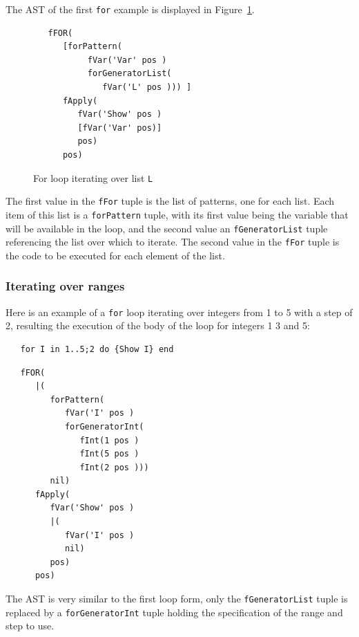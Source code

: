 \documentclass[a4paper]{memoir}
\begin{document}
The AST of the first \lstinline!for! example is displayed in Figure~\ref{fig:forlist}.
\begin{figure}[h]
\begin{lstlisting}
   fFOR(
      [forPattern(
           fVar('Var' pos )
           forGeneratorList(
              fVar('L' pos ))) ]
      fApply(
         fVar('Show' pos )
         [fVar('Var' pos)]
         pos)
      pos)
\end{lstlisting}
\caption{For loop iterating over list \lstinline!L!}
\label{fig:forlist}
\end{figure}


The first value in the \lstinline!fFor! tuple is the list of patterns, one
for each list. Each item of this list is a \lstinline!forPattern! tuple, with
its first value being the variable that will be available in the loop, and the
second value an \lstinline!fGeneratorList! tuple referencing the list over which to
iterate.
The second value in the \lstinline!fFor! tuple is the code to be executed for
each element of the list.

\subsubsection{Iterating over ranges}
Here is an example of a \lstinline!for! loop iterating over integers from 1 to 5
with a step of 2, resulting the execution of the body of the loop for integers 1
3 and 5:
\begin{lstlisting}
   for I in 1..5;2 do {Show I} end
\end{lstlisting}

\begin{lstlisting}
   fFOR(
      |(
         forPattern(
            fVar('I' pos )
            forGeneratorInt(
               fInt(1 pos )
               fInt(5 pos )
               fInt(2 pos )))
         nil)
      fApply(
         fVar('Show' pos )
         |(
            fVar('I' pos )
            nil)
         pos)
      pos)
\end{lstlisting}

The AST is very similar to the first loop form, only the
\lstinline!fGeneratorList! tuple is replaced by a \lstinline!forGeneratorInt!
tuple holding the specification of the range and step to use.
\end{document}
